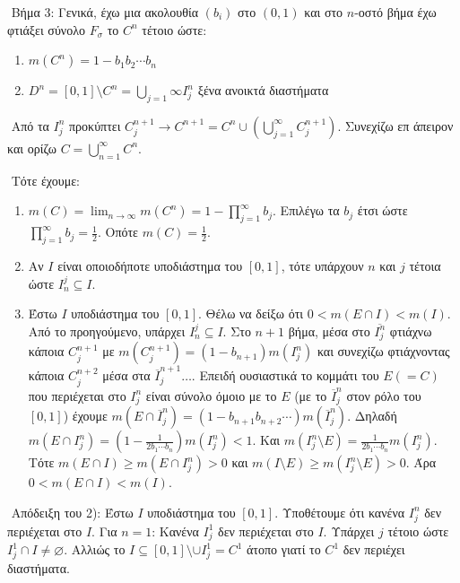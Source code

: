 $ $\newline
Βήμα 3: Γενικά, έχω μια ακολουθία $(b_i)$ στο $(0,1)$ και στο $n$-οστό βήμα έχω φτιάξει σύνολο $F_{\sigma}$ το $C^n$ τέτοιο ώστε:

\begin{enumerate}
    \item $m(C^n) = 1-b_1 b_2 \cdots b_n$
    \item $D^n = [0,1]\setminus C^n = \bigcup\limits_{j=1}{\infty} I^n_j$ ξένα ανοικτά διαστήματα
\end{enumerate}

$ $\newline
Από τα $I^n_j$ προκύπτει $C^{n+1}_j \rightarrow C^{n+1} = C^n \cup \left( \bigcup\limits_{j=1}^{\infty} C^{n+1}_j \right)$. Συνεχίζω επ άπειρον και ορίζω $C = \bigcup\limits_{n=1}^{\infty}C^n$.

$ $\newline
Τότε έχουμε:

\begin{enumerate}
    \item $m(C) =  \lim_{n\rightarrow \infty} m(C^n) = 1 - \prod\limits_{j=1}^{\infty} b_j$. Επιλέγω τα $b_j$ έτσι ώστε $\prod\limits_{j=1}^{\infty} b_j = \frac{1}{2}$. Οπότε $m(C) = \frac{1}{2}$.
    \item Αν $I$ είναι οποιοδήποτε υποδιάστημα του $[0,1]$, τότε υπάρχουν $n$ και $j$ τέτοια ώστε $I^j_n \subseteq I$.
    \item Έστω $I$ υποδιάστημα του $[0,1]$. Θέλω να δείξω ότι $0< m(E\cap I) < m(I)$. Από το προηγούμενο, υπάρχει $I^j_n \subseteq I$. Στο $n+1$ βήμα, μέσα στο $\overline{I^n_j}$ φτιάχνω κάποια $C^{n+1}_j$ με $m(C^{n+1}_j) = (1-b_{n+1}) m(I^n_j)$ και συνεχίζω φτιάχνοντας κάποια $C^{n+2}_j$ μέσα στα $\overline{I}^{n+1}_j \ldots$.
    \noindent Επειδή ουσιαστικά το κομμάτι του $E (=C)$ που περιέχεται στο $I^n_j$ είναι σύνολο όμοιο με το $E$ (με το $\overline{I}^n_j$ στον ρόλο του $[0,1]$) έχουμε $m(E \cap \overline{I}^n_j) = (1-b_{n+1}b_{n+2} \cdots)m(\overline{I}^n_j)$. Δηλαδή $m(E\cap I^n_j) = (1-\frac{1}{2b_1\cdots b_n}) m(I^n_j) < 1$. Και $m(I^n_j\setminus E) = \frac{1}{2b_1\cdots b_n} m(I^n_j)$. Τότε $m(E\cap I) \geq m(E\cap I^n_j) > 0$ και $m(I\setminus E) \geq m(I^n_j\setminus E) > 0$. Άρα $0< m(E\cap I) < m(I)$.
\end{enumerate}

$ $\newline
Απόδειξη του 2): Έστω $I$ υποδιάστημα του $[0,1]$. Υποθέτουμε ότι κανένα $I^n_j$ δεν περιέχεται στο $I$. Για $n=1$: Κανένα $I^1_j$ δεν περιέχεται στο $I$. Υπάρχει $j$ τέτοιο ώστε $I^1_j \cap I \neq \varnothing$. Αλλιώς το $I \subseteq [0,1] \setminus \cup I^1_j = C^1$ άτοπο γιατί το $C^1$ δεν περιέχει διαστήματα.

